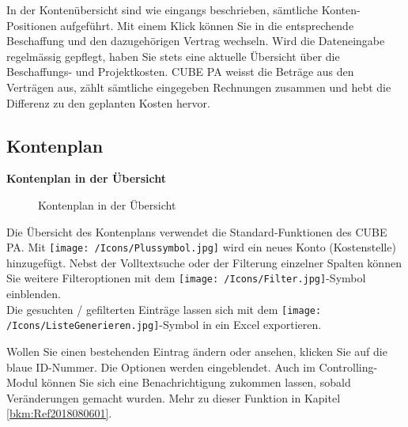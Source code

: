 In der Kontenübersicht sind wie eingangs beschrieben, sämtliche Konten-Positionen aufgeführt. Mit einem Klick können Sie in die entsprechende Beschaffung und den dazugehörigen Vertrag wechseln. Wird die Dateneingabe regelmässig gepflegt, haben Sie stets eine aktuelle Übersicht über die Beschaffungs- und Projektkosten. CUBE PA weisst die Beträge aus den Verträgen aus, zählt sämtliche eingegeben Rechnungen zusammen und hebt die Differenz zu den geplanten Kosten hervor.

\pagebreak
\subsection{Kontenplan}

\textbf{Kontenplan in der Übersicht}

\begin{figure}[H]
\caption{Kontenplan in der Übersicht}
\end{figure}

Die Übersicht des Kontenplans verwendet die Standard-Funktionen des CUBE PA. Mit \texttt{[image: /Icons/Plussymbol.jpg]} wird ein neues Konto (Kostenstelle) hinzugefügt. Nebst der Volltextsuche oder der Filterung einzelner Spalten können Sie weitere Filteroptionen mit dem \texttt{[image: /Icons/Filter.jpg]}-Symbol einblenden.\\
Die gesuchten / gefilterten Einträge lassen sich mit dem \texttt{[image: /Icons/ListeGenerieren.jpg]}-Symbol in ein Excel exportieren.

\vspace{\baselineskip}

Wollen Sie einen bestehenden Eintrag ändern oder ansehen, klicken Sie auf die blaue ID-Nummer. Die Optionen werden eingeblendet. Auch im Controlling-Modul können Sie sich eine Benachrichtigung zukommen lassen, sobald Veränderungen gemacht wurden. Mehr zu dieser Funktion in Kapitel \ref{bkm:Ref2018080601}.

